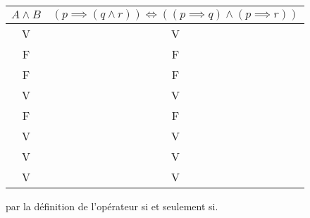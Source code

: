\documentclass{article}
\begin{document}
\begin{center}
\begin{tabular}{| c | c |}
\hline
$A \land B$ & $(p \implies (q \land r)) \iff ((p \implies q) \land (p \implies r))$\\
\hline
V & V \\
F & F \\
F & F \\
V & V \\
F & F \\
V & V \\
V & V \\
V & V \\
\hline
\end{tabular}
\end{center}

par la définition de l’opérateur si et seulement si.
\end{document}
